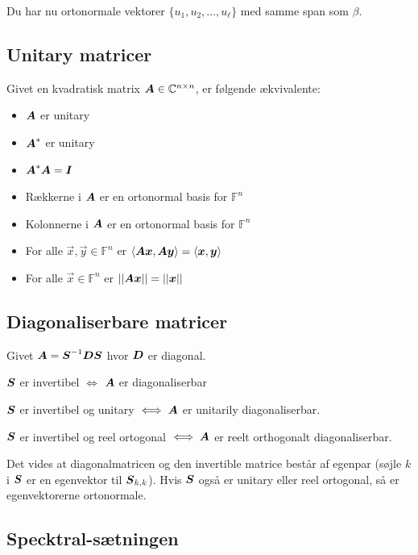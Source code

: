 Du har nu ortonormale vektorer $\{u_1, u_2, \ldots, u_\ell\}$ med samme span som $\beta$.


\subsection{Unitary matricer}
\label{sec:unitary-matricer}
Givet en kvadratisk matrix $\boldsymbol{A} \in \mathbb C^{n \times n}$, er følgende ækvivalente:
\begin{itemize}
    \item $\boldsymbol{A}$ er unitary
    \item $\boldsymbol{A}^*$ er unitary
    \item $\boldsymbol{A}^* \boldsymbol{A} = \boldsymbol{I}$
    \item Rækkerne i $\boldsymbol{A}$ er en ortonormal basis for $\mathbb F^n$
    \item Kolonnerne i $\boldsymbol{A}$ er en ortonormal basis for $\mathbb F^n$
    \item For alle $\vec x, \vec y \in \mathbb F^n$ er $\left \langle \boldsymbol{A} \boldsymbol{x}, \boldsymbol{A} \boldsymbol{y} \right \rangle = \left \langle \boldsymbol{x}, \boldsymbol{y} \right \rangle$
    \item For alle $\vec x \in \mathbb F^n$ er $||\boldsymbol{A} \boldsymbol{x}|| = ||\boldsymbol{x}||$
\end{itemize}

\subsection{Diagonaliserbare matricer}

Givet $\boldsymbol{A} = \boldsymbol{S}^{-1} \boldsymbol{D} \boldsymbol{S}$ hvor $\boldsymbol{D}$ er diagonal.

$\boldsymbol{S}$ er invertibel $\iff$ $\boldsymbol{A}$ er diagonaliserbar

$\boldsymbol{S}$ er invertibel og unitary $\iff \boldsymbol{A}$ er unitarily diagonaliserbar.

$\boldsymbol{S}$ er invertibel og reel ortogonal $\iff \boldsymbol{A}$ er reelt orthogonalt diagonaliserbar.

Det vides at diagonalmatricen og den invertible matrice består af egenpar (søjle $k$ i $\boldsymbol{S}$ er en egenvektor til $\boldsymbol{S}_{k,k}$).
Hvis $\boldsymbol{S}$ også er unitary eller reel ortogonal, så er egenvektorerne ortonormale.

\subsection{Specktral-sætningen}

